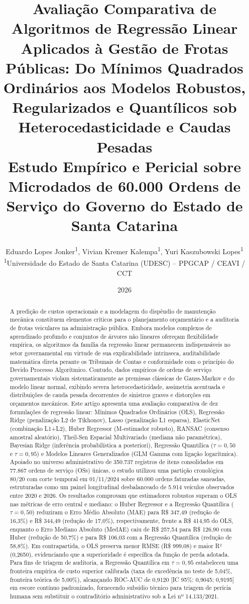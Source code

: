 \documentclass[10pt,a4paper,journal]{article}
\title{\textbf{Avaliação Comparativa de Algoritmos de Regressão Linear Aplicados à Gestão de Frotas Públicas: Do Mínimos Quadrados Ordinários aos Modelos Robustos, Regularizados e Quantílicos sob Heterocedasticidade e Caudas Pesadas}\\
\large Estudo Empírico e Pericial sobre Microdados de 60.000 Ordens de Serviço do Governo do Estado de Santa Catarina}
\author{Eduardo Lopes Jonker\textsuperscript{1}, Vivian Kremer Kalempa\textsuperscript{1}, Yuri Kaszubowski Lopes\textsuperscript{1}\\
\small \textsuperscript{1}Universidade do Estado de Santa Catarina (UDESC) -- PPGCAP / CEAVI / CCT}
\date{2026}
\begin{document}
\maketitle

\begin{abstract}
A predição de custos operacionais e a modelagem do dispêndio de manutenção mecânica constituem elementos críticos para o planejamento orçamentário e a auditoria de frotas veiculares na administração pública. Embora modelos complexos de aprendizado profundo e conjuntos de árvores não lineares ofereçam flexibilidade empírica, os algoritmos da família da regressão linear permanecem indispensáveis no setor governamental em virtude de sua explicabilidade intrínseca, auditabilidade matemática direta perante os Tribunais de Contas e conformidade com o princípio do Devido Processo Algorítmico. Contudo, dados empíricos de ordens de serviço governamentais violam sistematicamente as premissas clássicas de Gauss-Markov e do modelo linear normal, exibindo severa heterocedasticidade, assimetria acentuada e distribuições de cauda pesada decorrentes de sinistros graves e distorções em orçamentos mecânicos. Este artigo apresenta uma avaliação comparativa de dez formulações de regressão linear: Mínimos Quadrados Ordinários (OLS), Regressão Ridge (penalização L2 de Tikhonov), Lasso (penalização L1 esparsa), ElasticNet (combinação L1+L2), Huber Regressor (M-estimador robusto), RANSAC (consenso amostral aleatório), Theil-Sen Espacial Multivariado (mediana não paramétrica), Bayesian Ridge (inferência probabilística a posteriori), Regressão Quantílica ($\tau = 0,50$ e $\tau = 0,95$) e Modelos Lineares Generalizados (GLM Gamma com ligação logarítmica). Apoiado no universo administrativo de 350.737 registros de itens consolidados em 77.867 ordens de serviço (OSs) únicas, o estudo utilizou uma partição cronológica 80/20 com corte temporal em 01/11/2024 sobre 60.000 ordens faturadas saneadas, estruturadas como um painel longitudinal desbalanceado de 5.914 veículos observados entre 2020 e 2026. Os resultados comprovam que estimadores robustos superam o OLS nas métricas de erro central e mediano: o Huber Regressor e a Regressão Quantílica ($\tau = 0,50$) reduziram o Erro Médio Absoluto (MAE) para R\$ 347,49 (redução de 16,3\%) e R\$ 344,49 (redução de 17,0\%), respectivamente, frente a R\$ 414,95 do OLS, enquanto o Erro Mediano Absoluto (MedAE) caiu de R\$ 257,54 para R\$ 126,90 com Huber (redução de 50,7\%) e para R\$ 106,03 com a Regressão Quantílica (redução de 58,8\%). Em contrapartida, o OLS preserva menor RMSE (R\$ 999,08) e maior R² (0,2650), evidenciando que a superioridade é específica da função de perda adotada. Para fins de triagem de auditoria, a Regressão Quantílica em $\tau = 0,95$ estabeleceu uma fronteira empírica de custo superior calibrada (taxa de excedência no teste de 5,04\%, fronteira teórica de 5,00\%), alcançando ROC-AUC de 0,9120 [IC 95\%: 0,9045; 0,9195] em escore contínuo padronizado, fornecendo subsídio técnico para triagem de perícia humana sem substituir o contraditório administrativo sob a Lei nº 14.133/2021.


\end{abstract}
\end{document}
